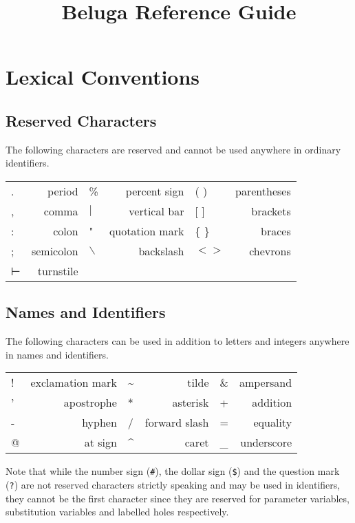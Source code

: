 \documentclass[11pt]{article}
\begin{document}
\title{Beluga Reference Guide}
\author{}
\date{}
\maketitle

\newpage

\section{Lexical Conventions}
\subsection{Reserved Characters}
The following characters are reserved and cannot be used anywhere in ordinary identifiers.
\begin{center}
\begin{tabular}{ | l r | l r | l r }
    . & period    & \%           & percent sign   & ( )   & parentheses \\
    , & comma     & $\vert$      & vertical bar   & [ ]   & brackets    \\
    : & colon     & "            & quotation mark & \{ \} & braces      \\
    ; & semicolon & $\backslash$ & backslash      & $< >$ & chevrons    \\
    ⊢ & turnstile &              &                &       &
\end{tabular}
\end{center}

\subsection{Names and Identifiers}
The following characters can be used in addition to letters and integers anywhere in names and identifiers.
\begin{center}
\begin{tabular}{ | l r | l r | l r }
    ! & exclamation mark & \~{} & tilde         & \& & ampersand  \\
    ' & apostrophe       & *    & asterisk      & +  & addition   \\
    - & hyphen           & /    & forward slash & =  & equality   \\
    @ & at sign          & \^{} & caret         & \_ & underscore
\end{tabular}
\end{center}
Note that while the number sign (\verb+#+), the dollar sign (\verb+$+) and the question mark (\verb+?+) are not reserved characters strictly speaking and may be used in identifiers, they cannot be the first character since they are reserved for parameter variables, substitution variables and labelled holes respectively.
\end{document}
